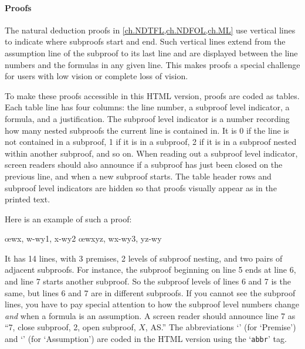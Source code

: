 \paragraph{Proofs} The natural deduction proofs in
\cref{ch.NDTFL,ch.NDFOL,ch.ML} use vertical lines to indicate where
subproofs start and end. Such vertical lines extend from the
assumption line of the subproof to its last line and are displayed
between the line numbers and the formulas in any given line. This
makes proofs a special challenge for users with low vision or complete
loss of vision. 

To make these proofs accessible in this HTML version, proofs are coded
as tables. Each table line has four columns: the line number, a
subproof level indicator, a formula, and a justification. The subproof
level indicator is a number recording how many nested subproofs the
current line is contained in. It is 0 if the line is not contained in
a subproof, 1 if it is in a subproof, 2 if it is in a subproof nested
within another subproof, and so on. When reading out a subproof level
indicator, screen readers should also announce if a subproof has just
been closed on the previous line, and when a new subproof starts. The
table header rows and subproof level indicators are hidden so that
proofs visually appear as in the printed text.

Here is an example of such a proof:
\begin{fitchproof}
\PR
{}\PR
{}\PR
\open
	\AS
	\open
		\AS
	\close
	\open
		\AS
	\close
	\oe{wx, w-wy1, x-wy2}
\close
\open
	\AS
\close
{}\oe{wxyz, wx-wy3, yz-wy}
\end{fitchproof}
It has 14 lines, with 3 premises, 2 levels of subproof nesting, and
two pairs of adjacent subproofs. For instance, the subproof beginning
on line 5 ends at line 6, and line 7 starts another subproof. So the
subproof levels of lines 6 and 7 is the same, but lines 6 and 7 are in
different subproofs. If you cannot see the subproof lines, you have to
pay special attention to how the subproof level numbers change
\emph{and} when a formula is an assumption. A screen reader should
announce line 7 as ``7, close subproof, 2, open subproof, $X$, AS.''
The abbreviations `\PR' (for `Premise') and `\AS' (for `Assumption')
are coded in the HTML version using the `\verb|abbr|' tag.